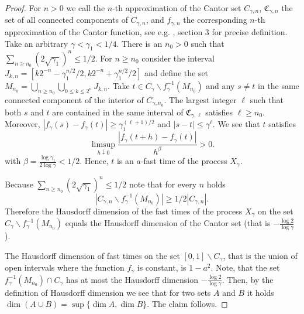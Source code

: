 \documentclass[11pt, reqno]{amsart}
\theoremstyle{plain}
\theoremstyle{definition}
\theoremstyle{remark}
\begin{document}
\begin{proof}
For $n>0$ we call the $n$-th approximation of the Cantor set $C_{\gamma,n}$, $\mathfrak{C}_{\gamma,n}$ the set of all connected components of $C_{\gamma,n}$, and $f_{\gamma,n}$ the corresponding $n$-th approximation of the Cantor function, see e.g. \cite{ABPR}, section 3 for precise definition.
Take an arbitrary $\gamma < \gamma_1 < 1/4$. 
There is an $n_0 >0$ such that $\sum_{n \geq n_0} (2\sqrt{\gamma_1})^n \leq 1/2$.
For $n \geq n_0$ consider the interval $J_{k,n}=[k2^{-n}-\gamma_1^{n/2}/2, k2^{-n}+\gamma_1^{n/2}/2]$ and define the set $M_{n_0}= \bigcup_{n \geq n_0} \bigcup_{0 \leq k \leq 2^{n}}J_{k,n}$.
Take $t \in C_\gamma \backslash f_\gamma^{-1}(M_{n_0})$ and any $s \ne t$ in the same connected component of the interior of $C_{\gamma,n_0}$.
The largest integer $\ell$ such that both $s$ and $t$ are contained in the same interval of $\mathfrak{C}_{\gamma,\ell}$ satisfies $\ell \geq n_0$. Moreover, $|f_\gamma(s)-f_\gamma(t)| \geq \gamma_1^{(\ell+1)/2}$ and $|s-t| \leq \gamma^{\ell}$.
We see that $t$ satisfies
\[
  \limsup_{h \downarrow 0} \frac{|f_\gamma(t+h)-f_\gamma(t)|}{h^\beta} > 0.
 \]
with $\beta = \frac{\log \gamma_1 }{2 \log \gamma} < 1/2$. Hence, $t$ is an $a$-fast time of the process $X_\gamma$.

Because $\sum_{n \geq n_0} (2\sqrt{\gamma_1})^n \leq 1/2$ note that for every $n$ holds $$|C_{\gamma,n} \backslash f_\gamma^{-1}(M_{n_0}) | \geq 1/2 |C_{\gamma,n}|.$$ Therefore
the Hausdorff dimension of the fast times of the process $X_\gamma$ on the set $C_\gamma \backslash f_\gamma^{-1}(M_{n_0})$ equals the Hausdorff dimension of the Cantor set (that is $-\frac{\log2}{\log\gamma}$).

The Hausdorff dimension of fast times on the set $[0,1]\backslash C_\gamma$, that is the union of open intervals where the function $f_\gamma$ is constant, is $1-a^2$.
Note, that the set $f_\gamma^{-1}(M_{n_0}) \cap C_\gamma$ has at most the Hausdorff dimension $-\frac{\log2}{\log\gamma}$. Then, by the definition of Hausdorff dimension we see that for two sets $A$ and $B$ it holds $\dim(A\cup B) = \sup\{ \dim A, \dim B \}$. The claim follows.
\end{proof}
\end{document}
